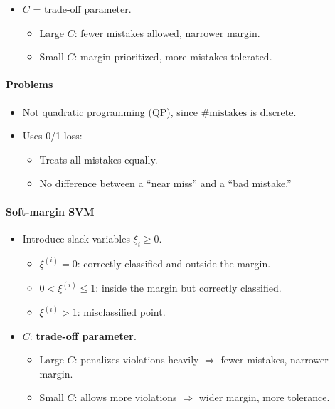 \documentclass[11pt]{article}
\begin{document}
\begin{itemize}
    \item $C$ = trade-off parameter.
        \begin{itemize}
            \item Large $C$: fewer mistakes allowed, narrower margin.
            \item Small $C$: margin prioritized, more mistakes tolerated.
        \end{itemize}
\end{itemize}

\paragraph*{Problems}
\begin{itemize}
    \item Not quadratic programming (QP), since $\#\text{mistakes}$ is discrete.
    \item Uses 0/1 loss:
    \begin{itemize}
        \item Treats all mistakes equally.
        \item No difference between a ``near miss'' and a ``bad mistake.''
    \end{itemize}
\end{itemize}

\paragraph*{Soft-margin SVM}

\begin{itemize}
    \item Introduce slack variables $\xi_i \geq 0$.
        \begin{itemize}
            \item $\xi^{(i)} = 0$: correctly classified and outside the margin.
            \item $0 < \xi^{(i)} \leq 1$: inside the margin but correctly classified.
            \item $\xi^{(i)} > 1$: misclassified point.
        \end{itemize}
    \item $C$: \textbf{trade-off parameter}.
        \begin{itemize}
            \item Large $C$: penalizes violations heavily $\Rightarrow$ fewer mistakes, narrower margin.
            \item Small $C$: allows more violations $\Rightarrow$ wider margin, more tolerance.
        \end{itemize}
\end{itemize}
\end{document}
